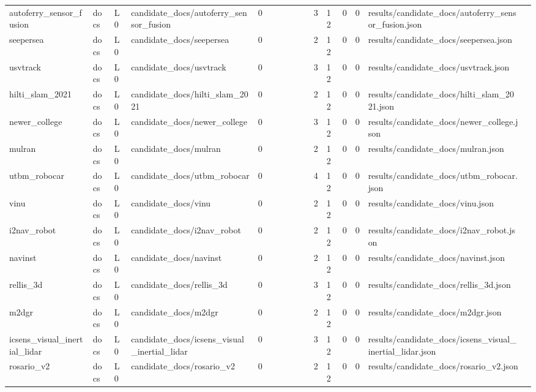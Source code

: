 \begin{tabular}{llllllllllllllll}
autoferry\_sensor\_fusion & docs & L0 & candidate\_docs/autoferry\_sensor\_fusion & 0 &  &  &  &  &  & 3 & 12 & 0 & 0 & results/candidate\_docs/autoferry\_sensor\_fusion.json &  \\
seepersea & docs & L0 & candidate\_docs/seepersea & 0 &  &  &  &  &  & 2 & 12 & 0 & 0 & results/candidate\_docs/seepersea.json &  \\
usvtrack & docs & L0 & candidate\_docs/usvtrack & 0 &  &  &  &  &  & 3 & 12 & 0 & 0 & results/candidate\_docs/usvtrack.json &  \\
hilti\_slam\_2021 & docs & L0 & candidate\_docs/hilti\_slam\_2021 & 0 &  &  &  &  &  & 2 & 12 & 0 & 0 & results/candidate\_docs/hilti\_slam\_2021.json &  \\
newer\_college & docs & L0 & candidate\_docs/newer\_college & 0 &  &  &  &  &  & 3 & 12 & 0 & 0 & results/candidate\_docs/newer\_college.json &  \\
mulran & docs & L0 & candidate\_docs/mulran & 0 &  &  &  &  &  & 2 & 12 & 0 & 0 & results/candidate\_docs/mulran.json &  \\
utbm\_robocar & docs & L0 & candidate\_docs/utbm\_robocar & 0 &  &  &  &  &  & 4 & 12 & 0 & 0 & results/candidate\_docs/utbm\_robocar.json &  \\
vinu & docs & L0 & candidate\_docs/vinu & 0 &  &  &  &  &  & 2 & 12 & 0 & 0 & results/candidate\_docs/vinu.json &  \\
i2nav\_robot & docs & L0 & candidate\_docs/i2nav\_robot & 0 &  &  &  &  &  & 2 & 12 & 0 & 0 & results/candidate\_docs/i2nav\_robot.json &  \\
navinst & docs & L0 & candidate\_docs/navinst & 0 &  &  &  &  &  & 2 & 12 & 0 & 0 & results/candidate\_docs/navinst.json &  \\
rellis\_3d & docs & L0 & candidate\_docs/rellis\_3d & 0 &  &  &  &  &  & 3 & 12 & 0 & 0 & results/candidate\_docs/rellis\_3d.json &  \\
m2dgr & docs & L0 & candidate\_docs/m2dgr & 0 &  &  &  &  &  & 2 & 12 & 0 & 0 & results/candidate\_docs/m2dgr.json &  \\
icsens\_visual\_inertial\_lidar & docs & L0 & candidate\_docs/icsens\_visual\_inertial\_lidar & 0 &  &  &  &  &  & 3 & 12 & 0 & 0 & results/candidate\_docs/icsens\_visual\_inertial\_lidar.json &  \\
rosario\_v2 & docs & L0 & candidate\_docs/rosario\_v2 & 0 &  &  &  &  &  & 2 & 12 & 0 & 0 & results/candidate\_docs/rosario\_v2.json &  \\
\bottomrule
\end{tabular}
